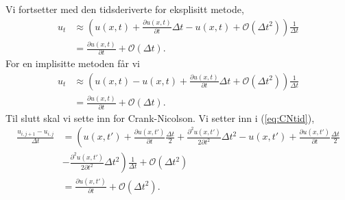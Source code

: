 \documentclass[norsk, 10pt]{article}
\begin{document}
Vi fortsetter med den tidsderiverte for eksplisitt metode,
\begin{align}
u_t &\approx \left(u(x,t)+\frac{\partial u(x,t)}{\partial t}\Delta t - u(x,t) +  \mathcal{O}(\Delta t^2) \right)\frac{1}{\Delta t} \nonumber\\
&=\frac{\partial u(x,t)}{\partial t}+ \mathcal{O}(\Delta t). \label{eq:trunkteksplisitt}
\end{align}
For en implisitte metoden får vi
\begin{align}
u_t &\approx \left(u(x,t) - u(x,t) + \frac{\partial u(x,t)}{\partial t}\Delta t  + \mathcal{O}(\Delta t^2) \right)\frac{1}{\Delta t} \nonumber\\
&=\frac{\partial u(x,t)}{\partial t}+ \mathcal{O}(\Delta t). \label{eq:trunktimplisitt} 
\end{align}
Til slutt skal vi sette inn for Crank-Nicolson. Vi setter inn i (\ref{eq:CNtid}),
\begin{align*}
\frac{u_{i,j+1}-u_{i,j}}{\Delta t} &= \left(u(x,t')+\frac{\partial u(x,t')}{\partial t}\frac{\Delta t}{2} +\frac{\partial ^2 u(x,t')}{2\partial t^2}\Delta t^2 - u(x,t')+\frac{\partial u(x,t')}{\partial t}\frac{\Delta t}{2} \right. \\
&\left.-\frac{\partial ^2 u(x,t')}{2\partial t^2}\Delta t^2\right)\frac{1}{\Delta t} + \mathcal{O}(\Delta t^2) \\
&= \frac{\partial u(x,t')}{\partial t}+ \mathcal{O}(\Delta t^2).
\end{align*}
\end{document}
